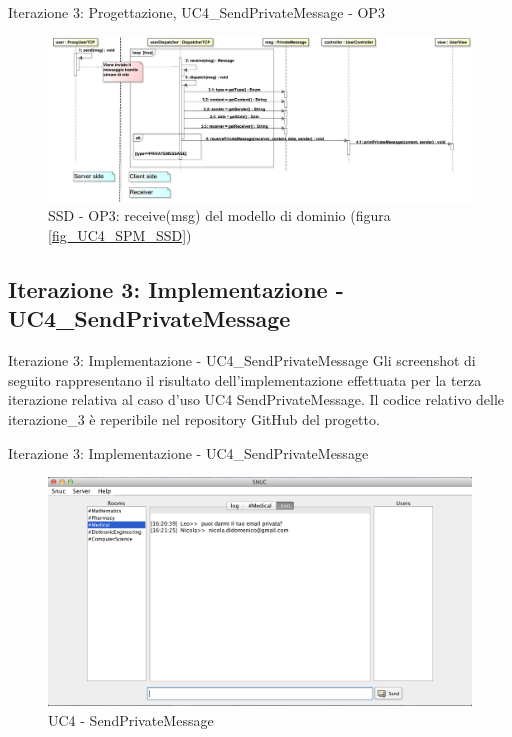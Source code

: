 \begin{frame} {Iterazione 3: Progettazione, UC4\_SendPrivateMessage - OP3}
   \begin{figure}
     \includegraphics[scale=0.14]{image_astah/Iteration_3_DesignModel/UC4_SendPrivateMessage_SSD_3_receive.png}{\centering}
     \caption{SSD - OP3: receive(msg) del modello di dominio (figura \ref{fig_UC4_SPM_SSD})}
     \label{fig_UC4_SSD_SRM_3} 
   \end{figure}
\end{frame}


\subsection {Iterazione 3: Implementazione - UC4\_SendPrivateMessage}
 \begin{frame} {Iterazione 3: Implementazione - UC4\_SendPrivateMessage }
   Gli screenshot di seguito rappresentano il risultato dell'implementazione effettuata per la terza iterazione relativa al caso d'uso UC4 SendPrivateMessage.
   \newline
   Il codice relativo delle iterazione\_3 è reperibile nel repository GitHub del progetto.
 \end{frame}

\begin{frame} {Iterazione 3: Implementazione - UC4\_SendPrivateMessage}
    \begin{figure}
    \includegraphics[scale=0.32]{image_implementation/uc4/10.png}{\centering}
    \caption{UC4 - SendPrivateMessage }
   \end{figure}
\end{frame}

